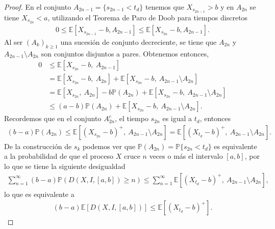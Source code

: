 \begin{proof}
En el conjunto $A_{2n - 1} = \{ s_{2n - 1} < t_d\}$ tenemos que $X_{s_{2n - 1}} > b$ y en $A_{2n}$ se tiene $X_{s_{2n}} < a$, utilizando el Teorema de Paro de Doob para tiempos discretos
	\begin{align*}
		0 \leq \mathbb{E} \left[ X_{s_{2n - 1}} - b, A_{2n - 1} \right] \leq \mathbb{E} \left[ X_{s_{2n}} - b, A_{2n - 1} \right].
	\end{align*}
Al ser $(A_k)_{k \geq 1}$ una sucesión de conjunto decreciente, se tiene que $A_{2n}$ y $A_{2n - 1} \setminus A_{2n}$ son conjuntos disjuntos a pares. Obtenemos entonces, 
	\begin{align*}
		0 & \leq \mathbb{E} \left[ X_{s_{2n}} - b, \ A_{2n - 1} \right] \\
        & = \mathbb{E} \left[ X_{s_{2n}} - b, \ A_{2n} \right] + \mathbb{E} \left[ X_{s_{2n}} - b, \ A_{2n - 1} \setminus A_{2n} \right] \\
        & = \mathbb{E} \left[ X_{s_{2n}}, \ A_{2n} \right] - b \mathbb{P} (A_{2n}) + \mathbb{E} \left[ X_{s_{2n}} - b, \ A_{2n - 1} \setminus A_{2n} \right] \\
        & \leq (a - b) \mathbb{P} (A_{2n}) + \mathbb{E} \left[ X_{s_{2n}} - b, \ A_{2n - 1} \setminus A_{2n} \right].
	\end{align*}
Recordemos que en el conjunto $A_{2n}^{c}$, el tiempo $s_{2n}$ es igual a $t_d$, entonces
	\begin{align*}
		(b - a) \mathbb{P}(A_{2n}) \leq \mathbb{E} \left[ (X_{s_{2n}} - b)^{+}, \ A_{2n - 1} \setminus A_{2n} \right] = \mathbb{E} \left[ (X_{t_d} - b)^{+}, \ A_{2n - 1} \setminus A_{2n} \right].
	\end{align*}
De la construcción de $s_k$ podemos ver que $\mathbb{P}(A_{2n}) = \mathbb{P} \{ s_{2n} < t_d \}$ es equivalente a la probabilidad de que el proceso $X$ cruce $n$ veces o más el intervalo $[a, b]$, por lo que se tiene la siguiente desigualdad
	\begin{align*}
		\sum_{n = 1}^{\infty} (b-a) \mathbb{P} \left( D(X, I, [a, b]) \geq n \right) \leq \sum_{n = 1}^{\infty} \mathbb{E} \left[ (X_{t_d} - b )^{+}, \ A_{2n - 1} \setminus A_{2n} \right],
	\end{align*}
lo que es equivalente a 
	\begin{align*}
		(b-a) \mathbb{E} \left[ D(X, I, [a, b]) \right] \leq \mathbb{E} \left[ (X_{t_d} - b )^{+} \right].
	\end{align*}
\end{proof}

